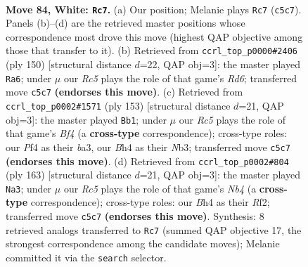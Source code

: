 \documentclass[11pt]{article}
\begin{document}
\clearpage

\begin{figure}[p]\centering
\begin{subfigure}{0.46\textwidth}\centering
\resizebox{\linewidth}{!}{%
\newchessgame
\chessboard[
  setfen={6k1/8/1n1r4/2R5/p4P1B/P6P/6K1/8 w - - 23 84},
  showmover=false,
  pgfstyle=straightmove, color=movearrow, markmove={c5-c7}
]}
\caption{}
\end{subfigure}\hfill
\begin{subfigure}{0.46\textwidth}\centering
\resizebox{\linewidth}{!}{%
\newchessgame
\chessboard[
  setfen={8/6k1/3R4/4p3/3pP1n1/6P1/6K1/8 w - - 7 76},
  showmover=false,
  pgfstyle=straightmove, color=movearrow, markmove={d6-a6}
]}
\caption{}
\end{subfigure}
\\[4pt]
\begin{subfigure}{0.46\textwidth}\centering
\resizebox{\linewidth}{!}{%
\newchessgame
\chessboard[
  setfen={8/5kp1/7p/5b2/7P/Bn2K1P1/4N3/8 b - - 1 77},
  showmover=false,
  pgfstyle=straightmove, color=movearrow, markmove={f5-b1}
]}
\caption{}
\end{subfigure}\hfill
\begin{subfigure}{0.46\textwidth}\centering
\resizebox{\linewidth}{!}{%
\newchessgame
\chessboard[
  setfen={2k5/8/4N3/1n1p3K/3P4/8/5r2/4R3 b - - 10 82},
  showmover=false,
  pgfstyle=straightmove, color=movearrow, markmove={b5-a3}
]}
\caption{}
\end{subfigure}
\caption{\textbf{Move 84, White: \texttt{Rc7}.} (a) Our position; Melanie plays \texttt{Rc7} (\texttt{c5c7}). Panels (b)--(d) are the retrieved master positions whose correspondence most drove this move (highest QAP objective among those that transfer to it). (b) Retrieved from \texttt{ccrl\_top\_p0000\#2406} (ply 150) [structural distance $d$=22, QAP obj=3]: the master played \texttt{Ra6}; under $\mu$ our \emph{Rc5} plays the role of that game's \emph{Rd6}; transferred move \texttt{c5c7} \textbf{(endorses this move)}. (c) Retrieved from \texttt{ccrl\_top\_p0002\#1571} (ply 153) [structural distance $d$=21, QAP obj=3]: the master played \texttt{Bb1}; under $\mu$ our \emph{Rc5} plays the role of that game's \emph{Bf4} (a \textbf{cross-type} correspondence); cross-type roles: our \emph{P}f4 as their \emph{b}a3, our \emph{B}h4 as their \emph{N}b3; transferred move \texttt{c5c7} \textbf{(endorses this move)}. (d) Retrieved from \texttt{ccrl\_top\_p0002\#804} (ply 163) [structural distance $d$=21, QAP obj=3]: the master played \texttt{Na3}; under $\mu$ our \emph{Rc5} plays the role of that game's \emph{Nb4} (a \textbf{cross-type} correspondence); cross-type roles: our \emph{B}h4 as their \emph{R}f2; transferred move \texttt{c5c7} \textbf{(endorses this move)}. Synthesis: 8 retrieved analogs transferred to \texttt{Rc7} (summed QAP objective 17, the strongest correspondence among the candidate moves); Melanie committed it via the \texttt{search} selector.}
\label{fig:thought-m166}
\end{figure}
\end{document}
